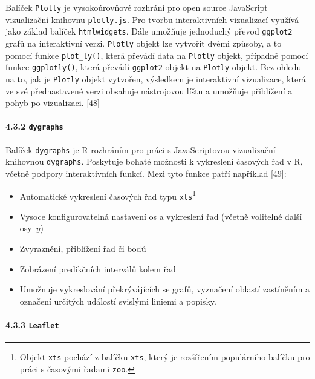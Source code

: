 \documentclass[12pt,]{article}
\providecommand{\tightlist}{%
  \setlength{\itemsep}{0pt}\setlength{\parskip}{0pt}}
\let\oldparagraph\paragraph
\renewcommand{\paragraph}[1]{\oldparagraph{#1}\mbox{}}
\let\rmarkdownfootnote\footnote%
\def\footnote{\protect\rmarkdownfootnote}
\begin{document}
\qquad Balíček \texttt{Plotly} je vysokoúrovňové rozhrání pro open
source JavaScript vizualizační knihovnu \texttt{plotly.js}. Pro tvorbu
interaktivních vizualizací využívá jako základ balíček
\texttt{htmlwidgets}. Dále umožňuje jednoduchý převod \texttt{ggplot2}
grafů na interaktivní verzi. \texttt{Plotly} objekt lze vytvořit dvěmi
způsoby, a to pomocí funkce \texttt{plot\_ly()}, která převádí data na
\texttt{Plotly} objekt, případně pomocí funkce \texttt{ggplotly()},
která převádí \texttt{ggplot2} objekt na \texttt{Plotly} objekt. Bez
ohledu na to, jak je \texttt{Plotly} objekt vytvořen, výsledkem je
interaktivní vizualizace, která ve své přednastavené verzi obsahuje
nástrojovou líštu a umožňuje přiblížení a pohyb po vizualizaci. {[}48{]}

\paragraph{\texorpdfstring{4.3.2
\texttt{dygraphs}}{4.3.2 dygraphs}}\label{dygraphs}

\qquad Balíček \texttt{dygraphs} je R rozhráním pro práci s
JavaScriptovou vizualizační knihovnou \texttt{dygraphs}. Poskytuje
bohaté možnosti k vykreslení časových řad v R, včetně podpory
interaktivních funkcí. Mezi tyto funkce patří například {[}49{]}:

\begin{itemize}
\tightlist
\item
  Automatické vykreslení časových řad typu \texttt{xts}\footnote{Objekt
    \texttt{xts} pochází z balíčku \texttt{xts}, který je rozšířením
    populárního balíčku pro práci s časovými řadami \texttt{zoo}.}
\item
  Vysoce konfigurovatelná nastavení os a vykreslení řad (včetně
  volitelné další osy~\(y\))
\item
  Zvyraznění, přiblížení řad či bodů
\item
  Zobrázení predikčních interválů kolem řad
\item
  Umožnuje vykreslování překrývájících se grafů, vyznačení oblastí
  zastíněním a označení určitých událostí svislými liniemi a popisky.
\end{itemize}

\hypertarget{leaflet}{\paragraph{\texorpdfstring{4.3.3
\texttt{Leaflet}}{4.3.3 Leaflet}}\label{leaflet}}
\end{document}
